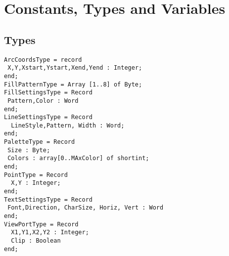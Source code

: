 \section{Constants, Types and Variables}
\subsection{Types}
\begin{verbatim}
ArcCoordsType = record
 X,Y,Xstart,Ystart,Xend,Yend : Integer;
end;
FillPatternType = Array [1..8] of Byte;
FillSettingsType = Record
 Pattern,Color : Word
end;
LineSettingsType = Record
  LineStyle,Pattern, Width : Word;
end;
PaletteType = Record
 Size : Byte;
 Colors : array[0..MAxColor] of shortint;
end;
PointType = Record
  X,Y : Integer;
end;
TextSettingsType = Record
 Font,Direction, CharSize, Horiz, Vert : Word
end;
ViewPortType = Record
  X1,Y1,X2,Y2 : Integer;
  Clip : Boolean
end;
\end{verbatim}
